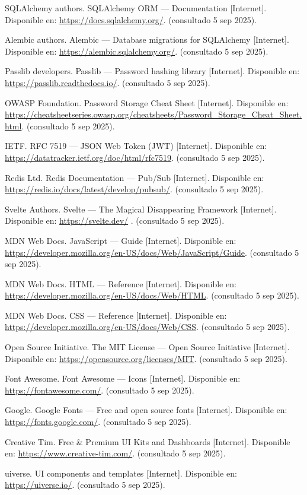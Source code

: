 \documentclass[12pt, a4paper]{article}
\begin{document}
\begin{thebibliography}{9}
SQLAlchemy authors. SQLAlchemy ORM — Documentation [Internet]. 
Disponible en: \url{https://docs.sqlalchemy.org/}. (consultado 5 sep 2025).

Alembic authors. Alembic — Database migrations for SQLAlchemy [Internet]. 
Disponible en: \url{https://alembic.sqlalchemy.org/}. (consultado 5 sep 2025).

Passlib developers. Passlib — Password hashing library [Internet]. 
Disponible en: \url{https://passlib.readthedocs.io/}. (consultado 5 sep 2025).
 
OWASP Foundation. Password Storage Cheat Sheet [Internet]. 
Disponible en: \url{https://cheatsheetseries.owasp.org/cheatsheets/Password_Storage_Cheat_Sheet.html}. (consultado 5 sep 2025).

IETF. RFC 7519 — JSON Web Token (JWT) [Internet]. 
Disponible en: \url{https://datatracker.ietf.org/doc/html/rfc7519}. (consultado 5 sep 2025).

Redis Ltd. Redis Documentation — Pub/Sub [Internet]. 
Disponible en: \url{https://redis.io/docs/latest/develop/pubsub/}. (consultado 5 sep 2025).
	
	

Svelte Authors. Svelte — The Magical Disappearing Framework [Internet]. 
Disponible en: \url{https://svelte.dev/} . (consultado 5 sep 2025).

MDN Web Docs. JavaScript — Guide [Internet]. 
Disponible en: \url{https://developer.mozilla.org/en-US/docs/Web/JavaScript/Guide}. (consultado 5 sep 2025).

MDN Web Docs. HTML — Reference [Internet]. 
Disponible en: \url{https://developer.mozilla.org/en-US/docs/Web/HTML}. (consultado 5 sep 2025).

MDN Web Docs. CSS — Reference [Internet]. 
Disponible en: \url{https://developer.mozilla.org/en-US/docs/Web/CSS}. (consultado 5 sep 2025).

Open Source Initiative. The MIT License — Open Source Initiative [Internet]. 
Disponible en: \url{https://opensource.org/licenses/MIT}. (consultado 5 sep 2025).

Font Awesome. Font Awesome — Icons [Internet]. 
Disponible en: \url{https://fontawesome.com/}. (consultado 5 sep 2025).

Google. Google Fonts — Free and open source fonts [Internet]. 
Disponible en: \url{https://fonts.google.com/}. (consultado 5 sep 2025).

Creative Tim. Free \& Premium UI Kits and Dashboards [Internet]. 
Disponible en: \url{https://www.creative-tim.com/}. (consultado 5 sep 2025).

uiverse. UI components and templates [Internet]. 
Disponible en: \url{https://uiverse.io/}. (consultado 5 sep 2025).

\end{thebibliography}
\end{document}
